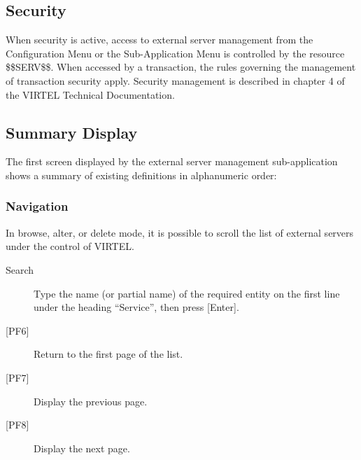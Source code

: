 \documentclass[letterpaper,10pt,english]{sphinxmanual}
\begin{document}

\subsection{Security}
\label{\detokenize{connectivity_guide:id67}}\label{\detokenize{connectivity_guide:index-131}}
When security is active, access to external server management from the Configuration Menu or the Sub-Application Menu is controlled by the resource \$\$SERV\$\$.
When accessed by a transaction, the rules governing the management of transaction security apply.
Security management is described in chapter 4 of the VIRTEL Technical Documentation.


\subsection{Summary Display}
\label{\detokenize{connectivity_guide:index-132}}\label{\detokenize{connectivity_guide:id68}}
The first screen displayed by the external server management sub-application shows a summary of existing definitions in alphanumeric order:



\subsubsection{Navigation}
\label{\detokenize{connectivity_guide:id69}}
In browse, alter, or delete mode, it is possible to scroll the list of external servers under the control of VIRTEL.
\begin{description}
\item[{Search}] \leavevmode
Type the name (or partial name) of the required entity on the first line under the heading “Service”, then press {[}Enter{]}.

\item[{{[}PF6{]}}] \leavevmode
Return to the first page of the list.

\item[{{[}PF7{]}}] \leavevmode
Display the previous page.

\item[{{[}PF8{]}}] \leavevmode
Display the next page.

\end{description}
\end{document}
